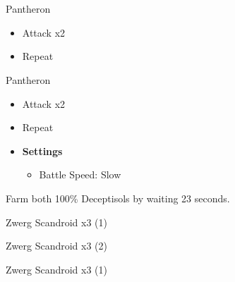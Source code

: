 \chapter[Chapter 2]{}

\begin{paracol}{2}

	\begin{battle}{Pantheron}
		\begin{itemize}
			\item Attack x2
			\item Repeat
		\end{itemize}
	\end{battle}

	\switchcolumn

	\begin{battle}{Pantheron}
		\begin{itemize}
			\item Attack x2
			\item Repeat
		\end{itemize}
	\end{battle}

	\switchcolumn*
	\begin{menu}
		\begin{itemize}
			\item \textbf{Settings}
			      \begin{itemize}
				      \item Battle Speed: Slow
			      \end{itemize}
		\end{itemize}
	\end{menu}

	Farm both 100\% Deceptisols by waiting 23 seconds.
	\switchcolumn
	\switchcolumn*
	\begin{battle}{Zwerg Scandroid x3 (1)}
	\end{battle}

	\begin{battle}{Zwerg Scandroid x3 (2)}
	\end{battle}


	\switchcolumn
	\begin{battle}{Zwerg Scandroid x3 (1)}
	\end{battle}


\end{paracol}
